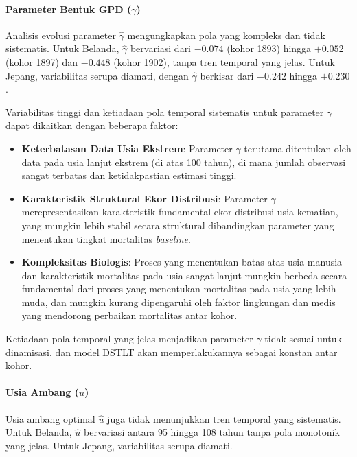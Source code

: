 \paragraph{Parameter Bentuk GPD ($\gamma$)}
Analisis evolusi parameter $\hat{\gamma}$ mengungkapkan pola yang kompleks dan tidak sistematis. Untuk Belanda, $\hat{\gamma}$ bervariasi dari $-0.074$ (kohor 1893) hingga $+0.052$ (kohor 1897) dan $-0.448$ (kohor 1902), tanpa tren temporal yang jelas. Untuk Jepang, variabilitas serupa diamati, dengan $\hat{\gamma}$ berkisar dari $-0.242$ hingga $+0.230$.

Variabilitas tinggi dan ketiadaan pola temporal sistematis untuk parameter $\gamma$ dapat dikaitkan dengan beberapa faktor:
\begin{itemize}
    \item \textbf{Keterbatasan Data Usia Ekstrem}: Parameter $\gamma$ terutama ditentukan oleh data pada usia lanjut ekstrem (di atas 100 tahun), di mana jumlah observasi sangat terbatas dan ketidakpastian estimasi tinggi.
    
    \item \textbf{Karakteristik Struktural Ekor Distribusi}: Parameter $\gamma$ merepresentasikan karakteristik fundamental ekor distribusi usia kematian, yang mungkin lebih stabil secara struktural dibandingkan parameter yang menentukan tingkat mortalitas \textit{baseline}.
    
    \item \textbf{Kompleksitas Biologis}: Proses yang menentukan batas atas usia manusia dan karakteristik mortalitas pada usia sangat lanjut mungkin berbeda secara fundamental dari proses yang menentukan mortalitas pada usia yang lebih muda, dan mungkin kurang dipengaruhi oleh faktor lingkungan dan medis yang mendorong perbaikan mortalitas antar kohor.
\end{itemize}

Ketiadaan pola temporal yang jelas menjadikan parameter $\gamma$ tidak sesuai untuk dinamisasi, dan model DSTLT akan memperlakukannya sebagai konstan antar kohor.

\paragraph{Usia Ambang ($u$)}
Usia ambang optimal $\hat{u}$ juga tidak menunjukkan tren temporal yang sistematis. Untuk Belanda, $\hat{u}$ bervariasi antara 95 hingga 108 tahun tanpa pola monotonik yang jelas. Untuk Jepang, variabilitas serupa diamati.


